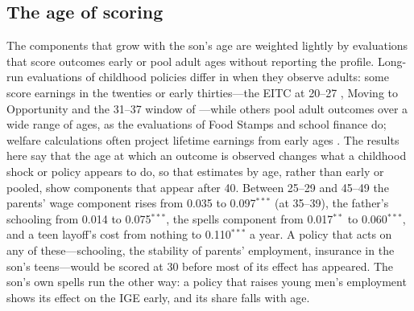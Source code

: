 \subsection{The age of scoring}

The components that grow with the son's age are weighted lightly by evaluations that score outcomes early or pool adult ages
without reporting the profile. Long-run evaluations of childhood policies differ in when they observe adults: some score earnings in the
twenties or early thirties---the EITC at 20--27 \citep{bastian2018long}, Moving to Opportunity \citep{chetty2016effects}
and the 31--37 window of \citet{chetty2020race}---while others pool adult outcomes over a wide range of ages, as the
evaluations of Food Stamps \citep{hoynes2016long, bailey2024safety} and school finance \citep{jackson2016effects} do; welfare calculations
often project lifetime earnings from early ages \citep{hendren2020unified}. The results here say that the age at which
an outcome is observed changes what a childhood shock or policy appears to do, so that estimates by age, rather than
early or pooled, show components that appear after 40. Between 25--29 and 45--49 the parents' wage component
rises from 0.035 to 0.097$^{***}$ (at 35--39), the father's schooling from 0.014 to 0.075$^{***}$, the spells component
from 0.017$^{**}$ to 0.060$^{***}$, and a teen layoff's cost from nothing to 0.110$^{***}$ a year. A policy that acts on
any of these---schooling, the stability of parents' employment, insurance in the son's teens---would be scored at 30
before most of its effect has appeared. The son's own spells run the other way: a policy that raises young men's
employment shows its effect on the IGE early, and its share falls with age.

